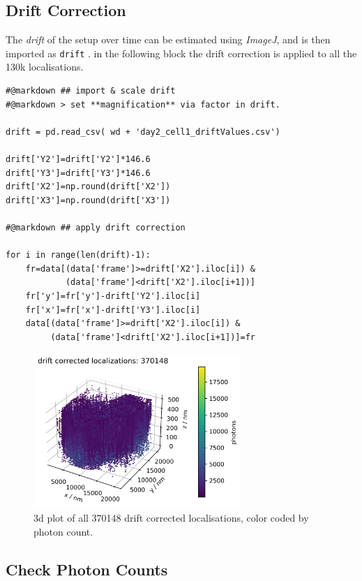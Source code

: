 \documentclass[11pt, a4paper, oneside, twocolumn]{report}
\renewcommand{\tt}{\texttt}
\renewcommand{\t}{\todo}
\newcommand{\e}{\emph}
\begin{document}
\subsection{Drift Correction}

The \e{drift} of the setup over time can be estimated using
\e{ImageJ}, and is then imported as \tt{drift} \t{drift}. in the
following block the drift correction is applied to all the 130k
localisations.

\begin{verbatim}
#@markdown ## import & scale drift
#@markdown > set **magnification** via factor in drift.

drift = pd.read_csv( wd + 'day2_cell1_driftValues.csv')

drift['Y2']=drift['Y2']*146.6
drift['Y3']=drift['Y3']*146.6
drift['X2']=np.round(drift['X2'])
drift['X3']=np.round(drift['X3'])

#@markdown ## apply drift correction

for i in range(len(drift)-1):
    fr=data[(data['frame']>=drift['X2'].iloc[i]) &
            (data['frame']<drift['X2'].iloc[i+1])]
    fr['y']=fr['y']-drift['Y2'].iloc[i]
    fr['x']=fr['x']-drift['Y3'].iloc[i]
    data[(data['frame']>=drift['X2'].iloc[i]) &
         (data['frame']<drift['X2'].iloc[i+1])]=fr
\end{verbatim}

\begin{figure}[h]
  \centering
  \includegraphics[width=0.7\textwidth]{2_drift.png}
  \caption{3d plot of all 370148 drift corrected localisations, color
    coded by photon count.}
  \label{f:2_drift}
\end{figure}


\subsection{Check Photon Counts}
\end{document}
